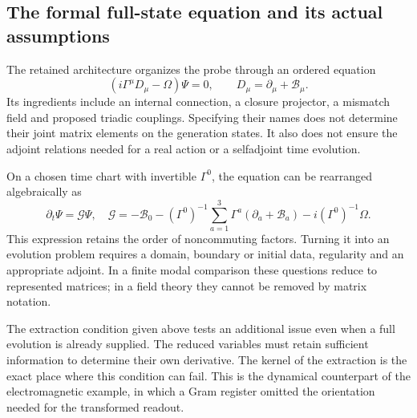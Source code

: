 \subsection{The formal full-state equation and its actual assumptions}
The retained architecture organizes the probe through an ordered equation
\begin{equation}
 (i\Gamma^\mu D_\mu-\Omega)\Psi=0,\qquad
 D_\mu=\partial_\mu+\mathcal B_\mu.
\end{equation}
Its ingredients include an internal connection, a closure projector,
a mismatch field and proposed triadic couplings. Specifying their
names does not determine their joint matrix elements on the generation
states. It also does not ensure the adjoint relations needed for a
real action or a selfadjoint time evolution.

On a chosen time chart with invertible $\Gamma^0$, the equation can
be rearranged algebraically as
\begin{equation}
 \partial_t\Psi=\mathcal G\Psi,
 \quad \mathcal G=-\mathcal B_0-(\Gamma^0)^{-1}
 \sum_{a=1}^3\Gamma^a(\partial_a+\mathcal B_a)
              -i(\Gamma^0)^{-1}\Omega.
\end{equation}
This expression retains the order of noncommuting factors. Turning it
into an evolution problem requires a domain, boundary or initial data,
regularity and an appropriate adjoint. In a finite modal comparison
these questions reduce to represented matrices; in a field theory they
cannot be removed by matrix notation.

The extraction condition given above tests an additional issue even
when a full evolution is already supplied. The reduced variables must
retain sufficient information to determine their own derivative.
The kernel of the extraction is the exact place where this condition
can fail. This is the dynamical counterpart of the electromagnetic
example, in which a Gram register omitted the orientation needed for
the transformed readout.

